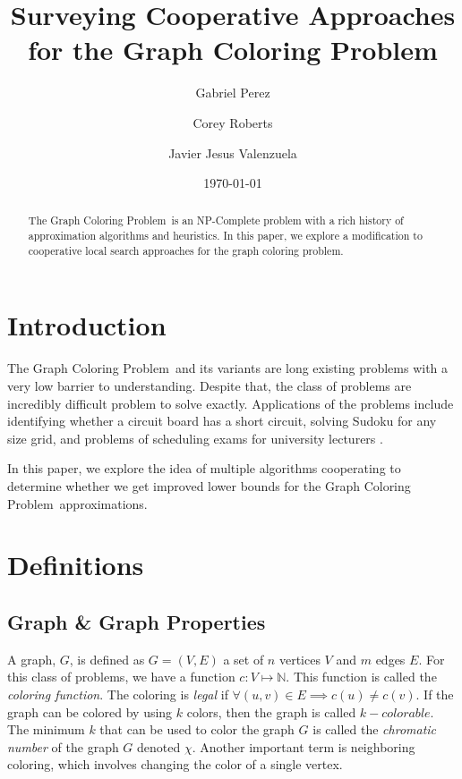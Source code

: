 \documentclass[runningheads]{llncs}
\title{Surveying Cooperative Approaches for the Graph Coloring Problem}
\author{Gabriel Perez
\and
Corey Roberts
\and
Javier Jesus Valenzuela
}
\date{\today}
\institute{ Department of Electrical and Computer  Engineering\\
  University of Texas at Austin,\\
  Austin, TX 78712\\
 \email{\{email1, email2\}@utexas.edu}}
\newcommand{\GCP}{{Graph Coloring Problem}\ }
\begin{document}
\def\IEEEQED{\mbox{\rule[0pt]{1.3ex}{1.3ex}}} %
\newcommand{\ep}{\hspace*{\fill}~\IEEEQED}
\newenvironment{mproof}[1][Proof]{{\bf #1: }}{\ep\vspace{.1in}}

\maketitle
\doublespacing

\begin{abstract}
The \GCP is an NP-Complete problem with a rich history of approximation algorithms and heuristics. In this paper, we explore a modification to cooperative local search approaches for the graph coloring problem.
\end{abstract}

\section{Introduction}
The \GCP and its variants are long existing problems with a very low barrier to understanding. Despite that, the class of problems are incredibly difficult problem to solve exactly. Applications of the problems include identifying whether a circuit board has a short circuit, solving Sudoku for any size grid, and problems of scheduling exams for university lecturers \cite{10.5555/2851123}.

In this paper, we explore the idea of multiple algorithms cooperating to determine whether we get improved lower bounds for the \GCP approximations.

\section{Definitions}

\subsection{Graph \& Graph Properties}

A graph, $G$, is defined as $G = (V, E)$ a set of $n$ vertices $V$ and $m$ edges $E$. For this class of problems, we have a function $c: V \mapsto \mathbb{N} $. This function is called the \emph{coloring function}. The coloring is \emph{legal} if $\forall (u, v) \in E \implies c(u) \ne c(v)$. If the graph can be colored by using $k$ colors, then the graph is called $k-colorable$. The minimum $k$ that can be used to color the graph $G$ is called the \emph{chromatic number} of the graph $G$ denoted $\chi$. Another important term is neighboring coloring, which involves changing the color of a single vertex.
\end{document}
